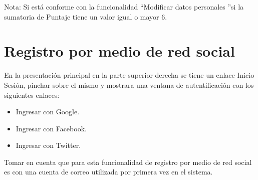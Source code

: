 Nota: Si est\'{a} conforme con la funcionalidad \textquotedblleft Modificar 
datos personales \textquotedblright si la sumatoria de Puntaje tiene un 
valor igual o mayor 6.

\section{Registro por medio de red social}

En la presentaci\'{o}n principal en la parte superior derecha se tiene un enlace 
Inicio Sesi\'{o}n, pinchar sobre el mismo y mostrara una ventana de autentificaci\'{o}n
con los siguientes enlaces:

\begin{itemize}
	\item Ingresar con Google.
	\item Ingresar con Facebook.
	\item Ingresar con Twitter.
\end{itemize}

Tomar en cuenta que para esta funcionalidad de registro por medio de red social
es con una cuenta de correo utilizada por primera vez en el sistema.

